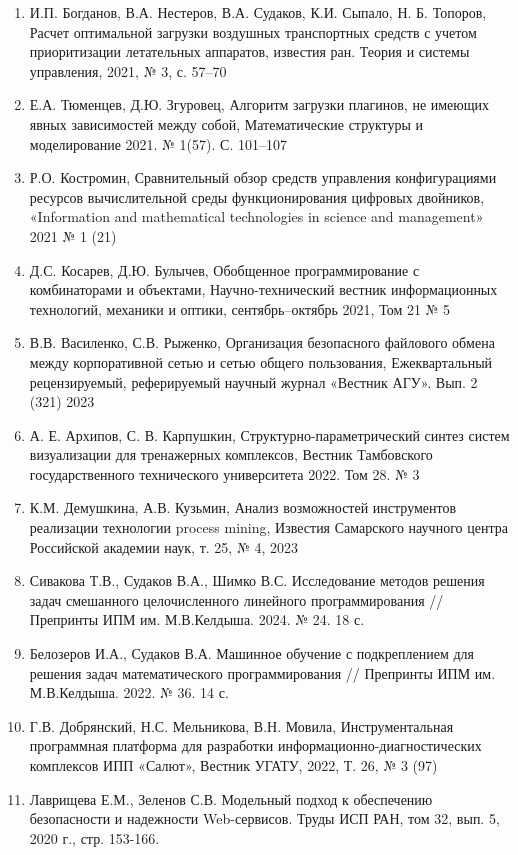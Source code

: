 \begin{enumerate}
  
  \item \label{lit:7} И.П. Богданов, В.А. Нестеров, В.А. Судаков, К.И. Сыпало, Н. Б. Топоров, Расчет оптимальной загрузки воздушных транспортных средств с учетом приоритизации летательных аппаратов, известия ран. Теория и системы управления, 2021, № 3, с. 57–70
  \item \label{lit:15} Е.А. Тюменцев, Д.Ю. Згуровец, Алгоритм загрузки плагинов, не имеющих явных зависимостей между собой, Математические структуры и моделирование 2021. № 1(57). С. 101–107
  \item \label{lit:17} Р.О. Костромин, Сравнительный обзор средств управления конфигурациями ресурсов вычислительной среды функционирования цифровых двойников, «Information and mathematical technologies in science and management» 2021 № 1 (21)
  \item \label{lit:18} Д.С. Косарев, Д.Ю. Булычев, Обобщенное программирование с комбинаторами и объектами, Научно-технический вестник информационных технологий, механики и оптики, сентябрь–октябрь 2021, Том 21 № 5
  \item \label{lit:19} В.В. Василенко, С.В. Рыженко, Организация безопасного файлового обмена между корпоративной сетью и сетью общего пользования, Ежеквартальный рецензируемый, реферируемый научный журнал «Вестник АГУ». Вып. 2 (321) 2023
  \item \label{lit:20} А. Е. Архипов, С. В. Карпушкин, Структурно-параметрический синтез систем визуализации для тренажерных комплексов, Вестник Тамбовского государственного технического университета 2022. Том 28. № 3
  \item \label{lit:21} К.М. Демушкина, А.В. Кузьмин, Анализ возможностей инструментов реализации технологии process mining, Известия Самарского научного центра Российской академии наук, т. 25, № 4, 2023
  \item \label{lit:22} Сивакова Т.В., Судаков В.А., Шимко В.С. Исследование методов решения задач смешанного целочисленного линейного программирования // Препринты ИПМ им. М.В.Келдыша. 2024. № 24. 18 с.
  \item \label{lit:23} Белозеров И.А., Судаков В.А. Машинное обучение с подкреплением для решения задач математического программирования // Препринты ИПМ им. М.В.Келдыша. 2022. № 36. 14 с.
  \item \label{lit:24} Г.В. Добрянский, Н.С. Мельникова, В.Н. Мовила, Инструментальная программная платформа для разработки информационно-диагностических комплексов ИПП «Салют», Вестник УГАТУ, 2022, Т. 26, № 3 (97)
  \item \label{lit:25} Лаврищева Е.М., Зеленов С.В. Модельный подход к обеспечению безопасности и надежности Web-сервисов. Труды ИСП РАН, том 32, вып. 5, 2020 г., стр. 153-166.
\end{enumerate}